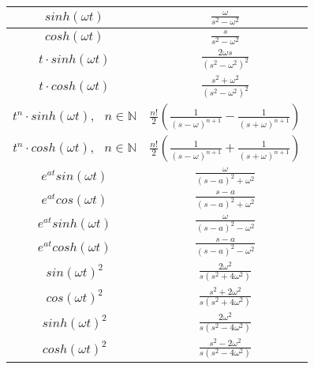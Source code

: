 \documentclass[./\jobname.tex]{subfiles}
\begin{document}
\begin{table}[H]
{\begin{tabular}{|c|c|}
			$sinh(\omega t)$ & $\frac{\omega}{s^2 - \omega^2}$ \\ \hline
			$cosh(\omega t)$ & $\frac{s}{s^2 - \omega^2}$ \\ \hline
			$t \cdot sinh(\omega t)$ & $\frac{2 \omega s}{(s^2 - \omega^2)^2}$ \\ \hline
			$t \cdot cosh(\omega t)$ & $\frac{s^2 + \omega^2}{(s^2 - \omega^2)^2}$ \\ \hline
			$t^n \cdot sinh(\omega t), \text{ } n \in \mathbb{N}$ & $ \frac{n!}{2} \left( \frac{1}{(s - \omega)^{n + 1}} - \frac{1}{(s + \omega)^{n+1}} \right)$ \\ \hline
			$t^n \cdot cosh(\omega t), \text{ } n \in \mathbb{N}$ & $ \frac{n!}{2} \left( \frac{1}{(s - \omega)^{n + 1}} + \frac{1}{(s + \omega)^{n+1}} \right)$ \\ \hline
			$e^{at} sin(\omega t)$ & $\frac{\omega}{(s - a)^2 + \omega^2}$ \\ \hline
			$e^{at} cos(\omega t)$ & $\frac{s - a}{(s - a)^2 + \omega^2}$ \\ \hline
			$e^{at} sinh(\omega t)$ & $\frac{\omega}{(s - a)^2 - \omega^2}$ \\ \hline
			$e^{at} cosh(\omega t)$ & $\frac{s - a}{(s - a)^2 - \omega^2}$ \\ \hline
			$sin(\omega t)^2$ & $\frac{2 \omega^2}{s(s^2 + 4\omega^2)}$ \\ \hline
			$cos(\omega t)^2$ & $\frac{s^2 + 2\omega^2}{s(s^2 + 4\omega^2)}$ \\ \hline
			$sinh(\omega t)^2$ & $\frac{2 \omega^2}{s(s^2 - 4\omega^2)}$ \\ \hline
			$cosh(\omega t)^2$ & $\frac{s^2 - 2\omega^2}{s(s^2 - 4\omega^2)}$ \\ \hline
		\end{tabular}
	}
\end{table}
\end{document}

